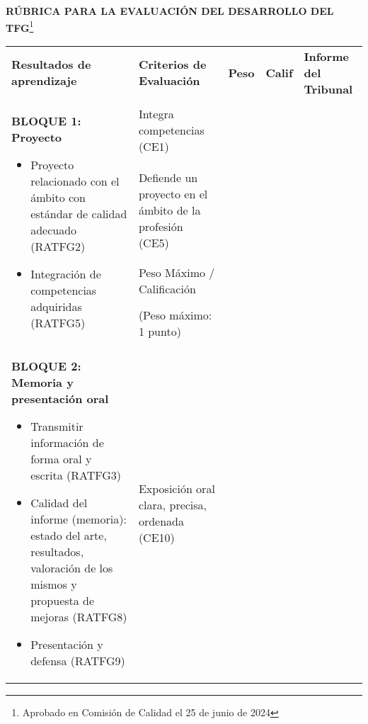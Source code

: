 \begin{landscape}
\thispagestyle{plain}
\noindent \textbf{RÚBRICA PARA LA EVALUACIÓN DEL DESARROLLO DEL TFG}\footnote{Aprobado en Comisión de Calidad el 25 de junio de 2024}
\renewcommand{\arraystretch}{1.4} %

\begin{table}[ht]
  \centering
  \small
\begin{tabularx}{\linewidth}{|p{7cm}|p{9cm}|p{1cm}|p{1cm}|p{5cm}|}
\cline{1-5}
\textbf{Resultados de aprendizaje} & \textbf{Criterios de Evaluación} & \textbf{Peso} & \textbf{Calif} & \textbf{Informe del Tribunal} \\ \cline{1-5}
  \multirow{4}{=}{%
  \begin{minipage}[t]{7cm}
    \textbf{BLOQUE 1: Proyecto}
    \begin{itemize}[left=5pt, itemsep=1pt, topsep=1pt]
      \item Proyecto relacionado con el ámbito con estándar de calidad adecuado (RATFG2)
      \item Integración de competencias adquiridas (RATFG5)
    \end{itemize}
  \end{minipage}}
    & Integra competencias (CE1) &  &  & \multirow[t]{7}{=}{} \\ \cline{2-4}
    & Defiende un proyecto en el ámbito de la profesión (CE5) &  &  &  \\ \cline{2-4}
    & \cellcolor[HTML]{C0C0C0}Peso Máximo / Calificación &  &  &  \\
    & \cellcolor[HTML]{C0C0C0}(Peso máximo: 1 punto) &  &  &  \\ \cline{1-5}
  \multirow{8}{=}{%
  \begin{minipage}[t]{7cm}
    \vspace{-5mm}
    \textbf{BLOQUE 2: Memoria y presentación oral}
    \begin{itemize}[left=5pt, itemsep=1pt, topsep=1pt]
      \item Transmitir información de forma oral y escrita (RATFG3)
      \item Calidad del informe (memoria): estado del arte, resultados, valoración de los mismos y propuesta de mejoras (RATFG8)
      \item Presentación y defensa (RATFG9)
    \end{itemize}
  \end{minipage}}
    & Exposición oral clara, precisa, ordenada (CE10) &  &  &  \multirow[t]{8}{=}{} \\ \cline{2-4}

\end{tabularx}
\end{table}
\end{landscape}
